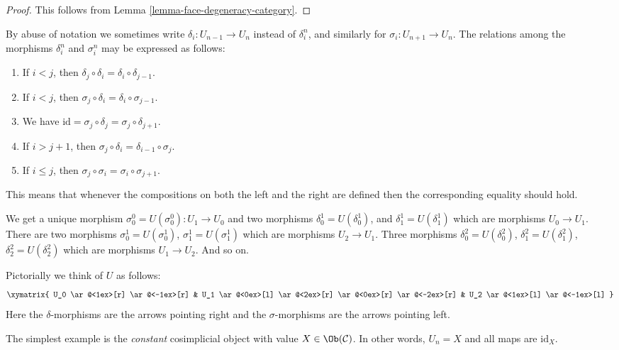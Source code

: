 \begin{proof}
This follows from Lemma \ref{lemma-face-degeneracy-category}.
\end{proof}

\begin{remark}
\label{remark-relations-cosimplicial}
By abuse of notation we sometimes write $\delta_i : U_{n - 1} \to U_n$
instead of $\delta^n_i$, and similarly for $\sigma_i : U_{n + 1} \to U_n$.
The relations among the morphisms $\delta^n_i$ and $\sigma^n_i$
may be expressed as follows:
\begin{enumerate}
\item If $i < j$, then
$\delta_j \circ \delta_i = \delta_i \circ \delta_{j - 1}$.
\item If $i < j$, then
$\sigma_j \circ \delta_i = \delta_i \circ \sigma_{j - 1}$.
\item We have
$\text{id} = \sigma_j \circ \delta_j = \sigma_j \circ \delta_{j + 1}$.
\item If $i > j + 1$, then
$\sigma_j \circ \delta_i = \delta_{i - 1} \circ \sigma_j$.
\item If $i \leq j$, then
$\sigma_j \circ \sigma_i = \sigma_i \circ \sigma_{j + 1}$.
\end{enumerate}
This means that whenever the compositions on both the left and the
right are defined then the corresponding equality should hold.
\end{remark}

\noindent
We get a unique morphism $\sigma^0_0 = U(\sigma^0_0) : U_1 \to U_0$ and
two morphisms $\delta^1_0 = U(\delta^1_0)$, and
$\delta^1_1 = U(\delta^1_1)$ which are morphisms $U_0 \to U_1$.
There are two morphisms
$\sigma^1_0 = U(\sigma^1_0)$, $\sigma^1_1 = U(\sigma^1_1)$
which are morphisms $U_2 \to U_1$. Three morphisms
$\delta^2_0 = U(\delta^2_0)$, $\delta^2_1 = U(\delta^2_1)$,
$\delta^2_2 = U(\delta^2_2)$
which are morphisms $U_1 \to U_2$. And so on.

\medskip\noindent
Pictorially we think of $U$ as follows:
$$
\xymatrix{
U_0
\ar@<1ex>[r]
\ar@<-1ex>[r]
&
U_1
\ar@<0ex>[l]
\ar@<2ex>[r]
\ar@<0ex>[r]
\ar@<-2ex>[r]
&
U_2
\ar@<1ex>[l]
\ar@<-1ex>[l]
}
$$
Here the $\delta$-morphisms are the arrows pointing right and the
$\sigma$-morphisms are the arrows pointing left.

\begin{example}
\label{example-constant-cosimplicial-object}
The simplest example is the {\it constant} cosimplicial object with
value $X \in \Ob(\mathcal{C})$. In other words, $U_n = X$ and
all maps are $\text{id}_X$.
\end{example}

